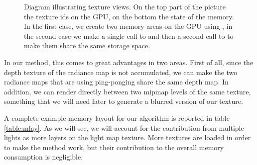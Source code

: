 \begin{figure}[h]
\centering
{}
\caption{Diagram illustrating texture views. On the top part of the picture the texture ids on the GPU, on the bottom the state of the memory. In the first case, we create two memory areas on the GPU using , in the second case we make a single call to  and then a second call to  to make them share the same storage space.}
\label{fig:textureviews}
\end{figure}
In our method, this comes to great advantages in two areas. First of all, since the depth texture of the radiance map is not accumulated, we can make the two radiance maps that are using ping-ponging share the same depth map. In addition, we can render directly between two mipmap levels of the same texture, something that we will need later to generate a blurred version of our texture.

A complete example memory layout for our algorithm is reported in table \ref{table:mlay}. As we will see, we will account for the contribution from multiple lights as more layers on the light map texture. More textures are loaded in order to make the method work, but their contribution to the overall memory consumption is negligible.

